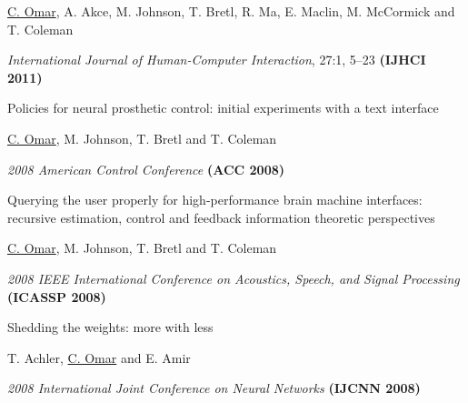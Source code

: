 \documentclass[10pt,letterpaper]{article}
\renewenvironment{itemize}{
  \begin{list}{}{
    \setlength{\leftmargin}{1.25em}
    \setlength{\itemsep}{0.25em}
    \setlength{\parskip}{0pt}
    \setlength{\parsep}{0.2em}
  }
}{
  \end{list}
}
\begin{document}
\begin{enumerate}
        \begin{itemize}
          \item  \underline{C. Omar}, A. Akce, M. Johnson, T. Bretl, R. Ma, E. Maclin, M. McCormick and T. Coleman
          \item \textit{International Journal of Human-Computer Interaction}, 27:1, 5--23 {\textbf{(IJHCI 2011)}}
        \end{itemize}
  \item Policies for neural prosthetic control: initial experiments with a text interface
        \begin{itemize}
          \item \underline{C. Omar}, M. Johnson, T. Bretl and T. Coleman
          \item \textit{2008 American Control Conference} {\textbf{(ACC 2008)}}
        \end{itemize}
  \item Querying the user properly for high-performance brain machine interfaces: recursive estimation, control and feedback information theoretic perspectives
        \begin{itemize}
          \item \underline{C. Omar}, M. Johnson, T. Bretl and T. Coleman
          \item \textit{2008 IEEE International Conference on Acoustics, Speech, and Signal Processing} {\textbf{(ICASSP 2008)}}
        \end{itemize}
  \item Shedding the weights: more with less
        \begin{itemize}
          \item T. Achler, \underline{C. Omar} and E. Amir
          \item \textit{2008 International Joint Conference on Neural Networks} {\textbf{(IJCNN 2008)}}
        \end{itemize}

\end{enumerate}

\end{document}
